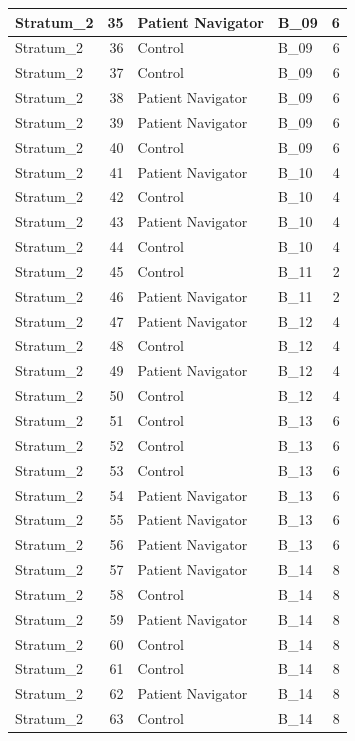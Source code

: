 \documentclass[
]{book}
\begin{document}
\begin{table}[H]
\begin{tabular}{l|r|l|l|r}
\hline
Stratum\_2 & 35 & Patient Navigator & B\_09 & 6\\
\hline
Stratum\_2 & 36 & Control & B\_09 & 6\\
\hline
Stratum\_2 & 37 & Control & B\_09 & 6\\
\hline
Stratum\_2 & 38 & Patient Navigator & B\_09 & 6\\
\hline
Stratum\_2 & 39 & Patient Navigator & B\_09 & 6\\
\hline
Stratum\_2 & 40 & Control & B\_09 & 6\\
\hline
Stratum\_2 & 41 & Patient Navigator & B\_10 & 4\\
\hline
Stratum\_2 & 42 & Control & B\_10 & 4\\
\hline
Stratum\_2 & 43 & Patient Navigator & B\_10 & 4\\
\hline
Stratum\_2 & 44 & Control & B\_10 & 4\\
\hline
Stratum\_2 & 45 & Control & B\_11 & 2\\
\hline
Stratum\_2 & 46 & Patient Navigator & B\_11 & 2\\
\hline
Stratum\_2 & 47 & Patient Navigator & B\_12 & 4\\
\hline
Stratum\_2 & 48 & Control & B\_12 & 4\\
\hline
Stratum\_2 & 49 & Patient Navigator & B\_12 & 4\\
\hline
Stratum\_2 & 50 & Control & B\_12 & 4\\
\hline
Stratum\_2 & 51 & Control & B\_13 & 6\\
\hline
Stratum\_2 & 52 & Control & B\_13 & 6\\
\hline
Stratum\_2 & 53 & Control & B\_13 & 6\\
\hline
Stratum\_2 & 54 & Patient Navigator & B\_13 & 6\\
\hline
Stratum\_2 & 55 & Patient Navigator & B\_13 & 6\\
\hline
Stratum\_2 & 56 & Patient Navigator & B\_13 & 6\\
\hline
Stratum\_2 & 57 & Patient Navigator & B\_14 & 8\\
\hline
Stratum\_2 & 58 & Control & B\_14 & 8\\
\hline
Stratum\_2 & 59 & Patient Navigator & B\_14 & 8\\
\hline
Stratum\_2 & 60 & Control & B\_14 & 8\\
\hline
Stratum\_2 & 61 & Control & B\_14 & 8\\
\hline
Stratum\_2 & 62 & Patient Navigator & B\_14 & 8\\
\hline
Stratum\_2 & 63 & Control & B\_14 & 8\\

\end{tabular}
\end{table}
\end{document}
